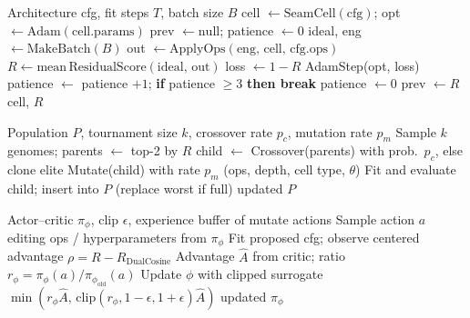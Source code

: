 \begin{algorithm}[t]
\caption{FitCell (inner loop)}
\label{alg:fit}
\begin{algorithmic}[1]
\Require Architecture cfg, fit steps $T$, batch size $B$
\State cell $\gets \mathrm{SeamCell}(\mathrm{cfg})$; opt $\gets \mathrm{Adam}(\mathrm{cell.params})$
\State prev $\gets \mathrm{null}$; patience $\gets 0$
  \State ideal, eng $\gets \mathrm{MakeBatch}(B)$
  \State out $\gets \mathrm{ApplyOps}(\mathrm{eng},\,\mathrm{cell},\,\mathrm{cfg.ops})$
  \State $R \gets \mathrm{mean}\,\mathrm{ResidualScore}(\mathrm{ideal},\,\mathrm{out})$
  \State loss $\gets 1-R$
   AdamStep(opt, loss)
  \EndIf
    \State patience $\gets$ patience $+1$; \textbf{if} patience $\ge 3$ \textbf{then break}
  \Else
    \State patience $\gets 0$
  \EndIf
  \State prev $\gets R$
\EndFor
\State \Return cell, $R$
\end{algorithmic}
\end{algorithm}

\begin{algorithm}[t]
\caption{GA tournament step}
\label{alg:ga}
\begin{algorithmic}[1]
\Require Population $P$, tournament size $k$, crossover rate $p_c$, mutation rate $p_m$
\State Sample $k$ genomes; parents $\gets$ top-2 by $R$
\State child $\gets$ Crossover(parents) with prob.\ $p_c$, else clone elite
\State Mutate(child) with rate $p_m$ (ops, depth, cell type, $\theta$)
\State Fit and evaluate child; insert into $P$ (replace worst if full)
\State \Return updated $P$
\end{algorithmic}
\end{algorithm}

\begin{algorithm}[t]
\caption{PPO architecture update}
\label{alg:ppo}
\begin{algorithmic}[1]
\Require Actor--critic $\pi_\phi$, clip $\epsilon$, experience buffer of mutate actions
\State Sample action $a$ editing ops / hyperparameters from $\pi_\phi$
\State Fit proposed cfg; observe centered advantage $\rho = R - R_{\mathrm{DualCosine}}$ 
\State Advantage $\hat{A}$ from critic; ratio $r_\phi = \pi_\phi(a)/\pi_{\phi_{\mathrm{old}}}(a)$
\State Update $\phi$ with clipped surrogate $\min(r_\phi\hat{A},\,\mathrm{clip}(r_\phi,1-\epsilon,1+\epsilon)\hat{A})$
\State \Return updated $\pi_\phi$
\end{algorithmic}
\end{algorithm}

